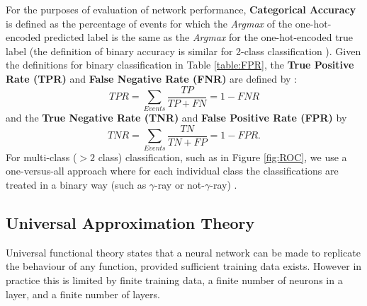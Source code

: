 \begin{table}[ht]
    \centering
    \caption{Definitions of Event Classifications for binary classification, taken from \cite{fawcett}.}
    \label{table:FPR}
\end{table}

For the purposes of evaluation of network performance, \textbf{Categorical Accuracy} \cite{Keras} is defined as the percentage of events for which the \textit{Argmax} of the one-hot-encoded predicted label is the same as the \textit{Argmax} for the one-hot-encoded true label (the definition of binary accuracy is similar for 2-class classification \cite{Keras}). Given the definitions for binary classification in Table \ref{table:FPR}, the \textbf{True Positive Rate (TPR)} and \textbf{False Negative Rate (FNR)} are defined by \cite{fawcett}:
\begin{equation}
    TPR=\sum_{Events}\frac{TP}{TP+FN}=1-FNR
\end{equation}
and the \textbf{True Negative Rate (TNR)} and \textbf{False Positive Rate (FPR)} by
\begin{equation}
    TNR=\sum_{Events}\frac{TN}{TN+FP}=1-FPR.
\end{equation} For multi-class ($>2$ class) classification, such as in Figure \ref{fig:ROC}, we use a one-versus-all approach where for each individual class the classifications are treated in a binary way (such as $\gamma$-ray or not-$\gamma$-ray) \cite{fawcett}\cite{scikit}. 

\subsection{Universal Approximation Theory}
Universal functional theory states that a neural network can be made to replicate the behaviour of any function, provided sufficient training data exists. However in practice this is limited by finite training data, a finite number of neurons in a layer, and a finite number of layers. \cite{universal}

